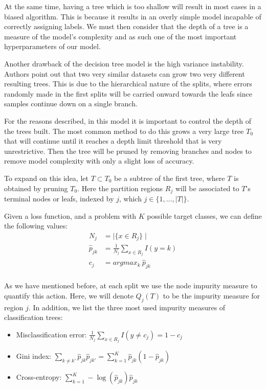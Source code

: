 At the same time, having a tree which is too shallow will result in most cases in a biased algorithm.
This is because it results in an overly simple model incapable of correctly assigning labels.
We must then consider that the depth of a tree is a measure of the model's complexity and as such one of the most important hyperparameters of our model.

Another drawback of the decision tree model is the high variance instability.
Authors point out that two very similar datasets can grow two very different resulting trees.
This is due to the hierarchical nature of the splits, where errors randomly made in the first splits will be carried onward towards the leafs since samples continue down on a single branch.

For the reasons described, in this model it is important to control the depth of the trees built.
The most common method to do this grows a very large tree $T_0$ that will continue until it reaches a depth limit threshold that is very unrestrictive.
Then the tree will be pruned by removing branches and nodes to remove model complexity with only a slight loss of accuracy.

To expand on this idea, let $T \subset T_0$ be a subtree of the first tree, where $T$ is obtained by pruning $T_0$. Here the partition regions $R_j$ will be associated to $T$'s terminal nodes or leafs, indexed by $j$, which $j \in \{1,\ldots,|T| \}$.

Given a loss function, and a problem with $K$ possible target classes, we can define the following values:
\begin{equation}
\begin{split}
N_j & = \mid \{x \in R_j \}\mid \\
\hat{p}_{jk} & = \frac{1}{N_j} \sum_{x \in R_j} I(y=k)\\
c_j & = argmax_{k} \ \hat{p}_{jk} \\
\end{split}
\end{equation}\label{eq:decisionTreePruneParameters}

As we have mentioned before, at each split we use the node impurity measure to quantify this action. Here, we will denote $Q_j(T)$ to be the impurity measure for region $j$. In addition, we list the three most used impurity measures of classification trees:

\begin{itemize}
\item Misclassification error: $ \displaystyle \frac{1}{N_j} \sum_{x \in R_j} I(y\neq c_j) = 1 - c_j $
\item Gini index: $ \displaystyle \sum_{k\neq k'} \hat{p}_{jk} \hat{p}_{jk'}  = \sum_{k=1}^{K} \hat{p}_{jk} (1 - \hat{p}_{jk}) $
\item Cross-entropy: $ \displaystyle \sum_{k=1}^{K} -\log(\hat{p}_{jk})\hat{p}_{jk} $
\end{itemize}


